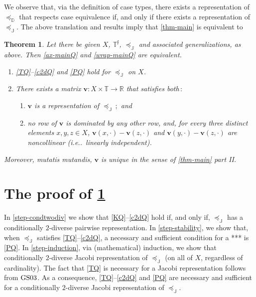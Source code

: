 \documentclass[ecta,nameyear,draft]{econsocart}
\makeatletter
\newcommand{\R}{\mathbb R}
\newcommand{\novel}{\mathfrak f}
\newcommand{\preceqb}{\mathbin{\preceq}}
\newcommand{\mbbd}{{\mathds D}}
\newcommand{\mbbt}{{\mathds {T}}}
\newcommand{\mbbtp}{{\mathds{T}^\novel}}
\newcommand{\mbbj}{\mathds J}
\newcommand\ie{i\@.e\@ifnextchar.{}{.\@}}
\newcommand{\gsii}{$\textup{GS03}$}
\theoremstyle{plain}
\newtheorem{theorem}{Theorem}%
\theoremstyle{remark}
\makeatother
\begin{document}
\begin{appendix}
  We observe that, via the definition of case types, there exists a
  representation of $\preceq_{\mbbd}$ that respects case equivalence if, and
  only if there exists a representation of $\preceq_{\mbbj}$. The above
  translation and results imply that \cref{thm-main} is equivalent to
  \begin{theorem}\label{thm-mainQ} Let there be given $X$, $\mbbtp$,
    $\preceqb_{\mbbj}$ and associated generalizations, as above. Then
    \ref{ax-mainQ} and \ref{wrap-mainQ} are equivalent.
    \begin{enumerate}[label=\textup{(\ref{thm-mainQ}.\roman*)}]
      \item\label{ax-mainQ} \ref{TQ}--\ref{c2dQ} and \ref{PQ} hold for 
        $\preceqb _ {\mbbj}$ on $X$.
      \item\label{wrap-mainQ} There exists a matrix $\mathbf{v} : X \times
        \mbbt \rightarrow \R$ that satisfies both$\,:$
        \begin{enumerate}[label=\textup{(\ref{thm-mainQ}.\alph*)}]
          \item\label{rep-mainQ} $\mathbf{v}$ is a representation of $\preceq _
            {\mbbj}\,;$ and
          \item\label{rows-mainQ} no row of $\mathbf{v}$ is dominated by any
            other row, and, for every three distinct elements $x,y, z \in X$,
            $\mathbf{v}(x,\cdot)-\mathbf{v}(z,\cdot) $ and
            $\mathbf{v}(y,\cdot)-\mathbf{v}(z,\cdot)$ are noncollinear (\ie\
            linearly independent).
        \end{enumerate}
    \end{enumerate}
    Moreover, \emph{mutatis mutandis}, $\mathbf{v}$ is unique in the sense of
    \cref{thm-main} part II.
  \end{theorem}

  \section{The proof of \cref{thm-mainQ}}\label{sec-proof-mainQ} 
    In \cref{step-condtwodiv} we show that
    \ref{KQ}–\ref{c2dQ} hold if, and only if, $\preceq_{\mbbj}$ has a
    conditionally $2$-diverse pairwise representation.  In
    \cref{step-stability}, we show that, when $\preceq_{\mbbj}$ satisfies
    \ref{TQ}–\ref{c2dQ}, a necessary and sufficient condition for a *** is
    \ref{PQ}. In \cref{step-induction}, via (mathematical) induction, we
    show that conditionally $2$-diverse Jacobi representation of
    $\preceq_{\mbbj}$ (on all of $X$, regardless of cardinality). The fact that
    \ref{TQ} is necessary for a Jacobi representation follows from \gsii.  As a
    consequence, \ref{TQ}–\ref{c2dQ} and \ref{PQ} are necessary and sufficient
    for a conditionally $2$-diverse Jacobi representation of $\preceq_{\mbbj}$.
  

\end{appendix}
\end{document}

